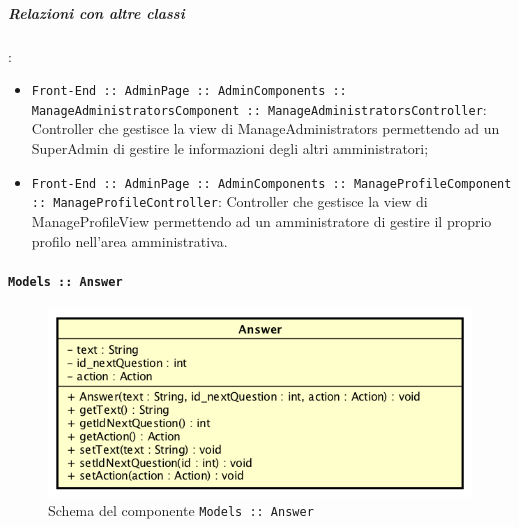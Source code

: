 \documentclass[../DefinizioneDiProdotto_v3.0.0.tex]{subfiles}
\begin{document}
		\subparagraph{Relazioni con altre classi}:
		      \begin{itemize}
		      	\item \texttt{Front-End :: AdminPage :: AdminComponents :: ManageAdministratorsComponent :: ManageAdministratorsController}: Controller che gestisce la view di ManageAdministrators permettendo ad un SuperAdmin di gestire le informazioni degli altri amministratori;
		      	\item \texttt{Front-End :: AdminPage :: AdminComponents :: ManageProfileComponent :: ManageProfileController}: Controller che gestisce la view di ManageProfileView permettendo ad un amministratore di gestire il proprio profilo nell'area amministrativa.
		      \end{itemize}

	\newpage
	\paragraph{\texttt{Models :: Answer}}
	\acapo
	\begin{figure}[!h]
		\centering
		\includegraphics[scale=0.7]{Architettura/Front-End/Models/Answer.png}
		\caption{Schema del componente \texttt{Models :: Answer}}
	\end{figure}
\end{document}
